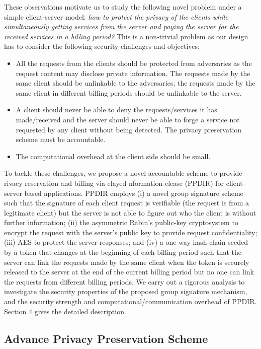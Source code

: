 \documentclass[letterpaper,12pt]{article}
\begin{document}
These observations motivate us to study the following novel problem under a simple client-server model: \emph{how to protect the privacy of the clients while simultaneously getting services from the server and paying the server for the received services in a billing period?} This is a non-trivial problem as our design has to consider the following security challenges and objectives:
\begin{itemize}
\item All the requests from the clients should be protected from adversaries as the request content may disclose private information. The requests made by the same client should be unlinkable to the adversaries; the requests made by the same client in different billing periods should be unlinkable to the server.
\item A client should never be able to deny the requests/services it has made/received and the server should never be able to forge a service not requested by any client without being detected. The privacy preservation scheme must be accountable.
\item The computational overhead at the client side should be small.
\end{itemize}

To tackle these challenges, we propose a novel accountable scheme to provide rivacy reservation and billing via elayed nformation elease (PPDIR) for client-server based applications. PPDIR employs (i) a novel group signature scheme such that the signature of each client request is verifiable (the request is from a legitimate client) but the server is not able to figure out who the client is without further information; (ii) the asymmetric Rabin's public-key cryptosystem to encrypt the request with the server's public key to provide request confidentiality; (iii) AES to protect the server responses; and (iv) a one-way hash chain seeded by a token that changes at the beginning of each billing period such that the server can link the requests made by the same client when the token is securely released to the server at the end of the current billing period but no one can link the requests from different billing periods. We carry out a rigorous analysis to investigate the security properties of the proposed group signature mechanism, and the security strength and computational/communication overhead of PPDIR. Section 4 gives the detailed description.

\subsection{Advance Privacy Preservation Scheme}
\end{document}
